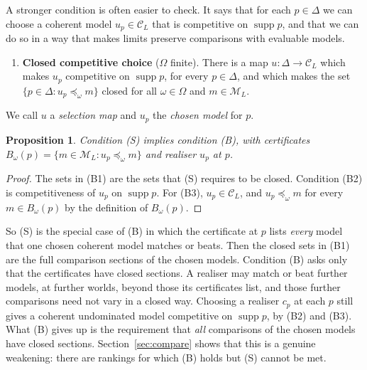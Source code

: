 \documentclass[11pt]{article}
\newtheorem{proposition}[theorem]{Proposition}
\theoremstyle{definition}
\theoremstyle{remark}
\newcommand{\M}{\mathcal M}
\newcommand{\C}{\mathcal C}
\newcommand{\supp}{\operatorname{supp}}
\begin{document}
A stronger condition is often easier to check. It says that for each $p\in\Delta$ we can choose a coherent model $u_p\in\C_L$ that is competitive on $\supp p$, and that we can do so in a way that makes limits preserve comparisons with evaluable models.
\begin{enumerate}[label=\textbf{(S)},leftmargin=*]
\item \textbf{Closed competitive choice} ($\Omega$ finite). There is a map $u:\Delta\to\C_L$ which makes $u_p$ competitive on $\supp p$, for every $p\in\Delta$, and which makes the set $\{p\in\Delta:u_p\preceq_\omega m\}$ closed for all $\omega\in\Omega$ and $m\in\M_L$.
\end{enumerate}
We call $u$ a \emph{selection map} and $u_p$ the \emph{chosen model} for $p$.

\begin{proposition}\label{prop:SB}
Condition (S) implies condition (B), with certificates $B_\omega(p)=\{m\in\M_L:u_p\preceq_\omega m\}$ and realiser $u_p$ at $p$.
\end{proposition}
\begin{proof}
The sets in (B1) are the sets that (S) requires to be closed. Condition (B2) is competitiveness of $u_p$ on $\supp p$. For (B3), $u_p\in\C_L$, and $u_p\preceq_\omega m$ for every $m\in B_\omega(p)$ by the definition of $B_\omega(p)$.
\end{proof}
So (S) is the special case of (B) in which the certificate at $p$ lists \emph{every} model that one chosen coherent model matches or beats. Then the closed sets in (B1) are the full comparison sections of the chosen models. Condition (B) asks only that the certificates have closed sections. A realiser may match or beat further models, at further worlds, beyond those its certificates list, and those further comparisons need not vary in a closed way. Choosing a realiser $c_p$ at each $p$ still gives a coherent undominated model competitive on $\supp p$, by (B2) and (B3). What (B) gives up is the requirement that \emph{all} comparisons of the chosen models have closed sections. Section~\ref{sec:compare} shows that this is a genuine weakening: there are rankings for which (B) holds but (S) cannot be met.
\end{document}
